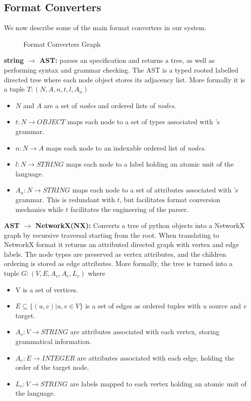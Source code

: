 \documentclass[runningheads]{llncs}
\begin{document}
\subsection{Format Converters}

We now describe some of the main format converters in our system.

\begin{figure}
\centering
  
  \caption{Format Converters Graph}
    \label{fig:FormatConverts}
\end{figure}

\textbf{\essence string $\rightarrow$ \essence AST:} parses an \essence specification and returns a tree, as well as performing syntax and grammar checking. The AST is a typed rooted labelled directed tree where each node object stores its adjacency list. More formally it is a tuple $T : (N, A, n, t, l, A_n)$
\begin{itemize}
    \item $N$ and $A$ are a set of \textit{nodes} and ordered lists of \textit{nodes}.
    \item $t : N \rightarrow OBJECT$ maps each node to a set of types associated with \essence's grammar.
    \item $n : N \rightarrow A$ maps each node to an indexable ordered list of \textit{nodes}.
    \item $l : N \rightarrow STRING$ maps each node to a label holding an atomic unit of the \essence language.
    \item $A_n : N \rightarrow STRING$ maps each node to a set of attributes associated with \essence's grammar. This is redundant with $t$, but facilitates format conversion mechanics while $t$ facilitates the engineering of the parser.
\end{itemize}

\noindent\textbf{\essence AST $\rightarrow$ NetworkX(NX):} Converts a tree of python objects into a NetworkX graph by recursive traversal starting from the root.
When translating to NetworkX format it returns an attributed directed graph with vertex and edge labels. The node types are preserved as vertex attributes, and the children ordering is stored as edge attributes. More formally, the tree is turned into a tuple $G : (V, E, A_v,A_e, L_v)$ where
\begin{itemize}
    \item V is a set of vertices.
    \item $E \subseteq \{(u,v) | u,v \in V\}$ is a set of edges as ordered tuples with $u$ source and $v$ target.
    \item $A_v : V \rightarrow STRING$ are attributes associated with each vertex, storing grammatical information.
    \item $A_e : E \rightarrow INTEGER$ are attributes associated with each edge, holding the order of the target node.
    \item $L_v : V \rightarrow STRING$ are labels mapped to each vertex holding an atomic unit of the \essence language.
\end{itemize}
\end{document}
